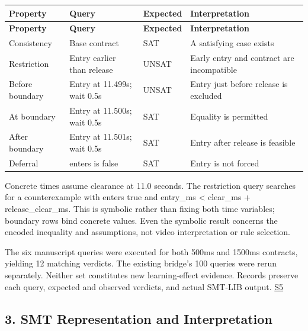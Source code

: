 \documentclass[11pt,a4paper]{article}
\begin{document}
\begingroup\small
\begin{longtable}{@{}>{\raggedright\arraybackslash}p{}>{\raggedright\arraybackslash}p{}>{\raggedright\arraybackslash}p{}>{\raggedright\arraybackslash}p{}@{}}
\toprule
\textbf{Property} & \textbf{Query} & \textbf{Expected} & \textbf{Interpretation} \\
\midrule\endfirsthead
\toprule
\textbf{Property} & \textbf{Query} & \textbf{Expected} & \textbf{Interpretation} \\
\midrule\endhead
\bottomrule\endfoot
Consistency & Base contract & SAT & A satisfying case exists \\
Restriction & Entry earlier than release & UNSAT & Early entry and contract are incompatible \\
Before boundary & Entry at 11.499s; wait 0.5s & UNSAT & Entry just before release is excluded \\
At boundary & Entry at 11.500s; wait 0.5s & SAT & Equality is permitted \\
After boundary & Entry at 11.501s; wait 0.5s & SAT & Entry after release is feasible \\
Deferral & enters is false & SAT & Entry is not forced \\
\end{longtable}
\endgroup

Concrete times assume clearance at 11.0 seconds. The restriction query searches for a counterexample with {\ttfamily\small enters} true and {\ttfamily\small entry\_\allowbreak{}ms < clear\_\allowbreak{}ms + release\_\allowbreak{}clear\_\allowbreak{}ms}. This is symbolic rather than fixing both time variables; boundary rows bind concrete values. Even the symbolic result concerns the encoded inequality and assumptions, not video interpretation or rule selection.\par

The six manuscript queries were executed for both 500ms and 1500ms contracts, yielding 12 matching verdicts. The existing bridge's 100 queries were rerun separately. Neither set constitutes new learning-effect evidence. Records preserve each query, expected and observed verdicts, and actual SMT-LIB output. \href{\detokenize{manuscript_examples.json}}{S5}\par

\subsection*{3. SMT Representation and Interpretation}
\end{document}
